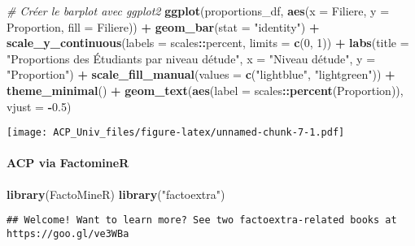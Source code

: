 \documentclass[
]{article}
\newenvironment{Shaded}{\begin{snugshade}}{\end{snugshade}}
\newcommand{\AttributeTok}[1]{\textcolor[rgb]{0.13,0.29,0.53}{#1}}
\newcommand{\CommentTok}[1]{\textcolor[rgb]{0.56,0.35,0.01}{\textit{#1}}}
\newcommand{\DecValTok}[1]{\textcolor[rgb]{0.00,0.00,0.81}{#1}}
\newcommand{\FloatTok}[1]{\textcolor[rgb]{0.00,0.00,0.81}{#1}}
\newcommand{\FunctionTok}[1]{\textcolor[rgb]{0.13,0.29,0.53}{\textbf{#1}}}
\newcommand{\NormalTok}[1]{#1}
\newcommand{\SpecialCharTok}[1]{\textcolor[rgb]{0.81,0.36,0.00}{\textbf{#1}}}
\newcommand{\StringTok}[1]{\textcolor[rgb]{0.31,0.60,0.02}{#1}}
\begin{document}
\begin{Shaded}
\begin{Highlighting}[]
\CommentTok{\# Créer le barplot avec ggplot2}
\FunctionTok{ggplot}\NormalTok{(proportions\_df, }\FunctionTok{aes}\NormalTok{(}\AttributeTok{x =}\NormalTok{ Filiere, }\AttributeTok{y =}\NormalTok{ Proportion, }\AttributeTok{fill =}\NormalTok{ Filiere)) }\SpecialCharTok{+}
  \FunctionTok{geom\_bar}\NormalTok{(}\AttributeTok{stat =} \StringTok{"identity"}\NormalTok{) }\SpecialCharTok{+}
  \FunctionTok{scale\_y\_continuous}\NormalTok{(}\AttributeTok{labels =}\NormalTok{ scales}\SpecialCharTok{::}\NormalTok{percent, }\AttributeTok{limits =} \FunctionTok{c}\NormalTok{(}\DecValTok{0}\NormalTok{, }\DecValTok{1}\NormalTok{)) }\SpecialCharTok{+}
  \FunctionTok{labs}\NormalTok{(}\AttributeTok{title =} \StringTok{"Proportions des Étudiants par niveau d\textquotesingle{}étude"}\NormalTok{, }\AttributeTok{x =} \StringTok{"Niveau d\textquotesingle{}étude"}\NormalTok{, }\AttributeTok{y =} \StringTok{"Proportion"}\NormalTok{) }\SpecialCharTok{+}
  \FunctionTok{scale\_fill\_manual}\NormalTok{(}\AttributeTok{values =} \FunctionTok{c}\NormalTok{(}\StringTok{"lightblue"}\NormalTok{, }\StringTok{"lightgreen"}\NormalTok{)) }\SpecialCharTok{+}
  \FunctionTok{theme\_minimal}\NormalTok{() }\SpecialCharTok{+}
  \FunctionTok{geom\_text}\NormalTok{(}\FunctionTok{aes}\NormalTok{(}\AttributeTok{label =}\NormalTok{ scales}\SpecialCharTok{::}\FunctionTok{percent}\NormalTok{(Proportion)), }\AttributeTok{vjust =} \SpecialCharTok{{-}}\FloatTok{0.5}\NormalTok{)}
\end{Highlighting}
\end{Shaded}

\texttt{[image: ACP\_Univ\_files/figure-latex/unnamed-chunk-7-1.pdf]}

\hypertarget{acp-via-factominer}{%
\paragraph{ACP via FactomineR}\label{acp-via-factominer}}

\begin{Shaded}
\begin{Highlighting}[]
\FunctionTok{library}\NormalTok{(FactoMineR)}
\FunctionTok{library}\NormalTok{(}\StringTok{"factoextra"}\NormalTok{)}
\end{Highlighting}
\end{Shaded}

\begin{verbatim}
## Welcome! Want to learn more? See two factoextra-related books at https://goo.gl/ve3WBa
\end{verbatim}
\end{document}
